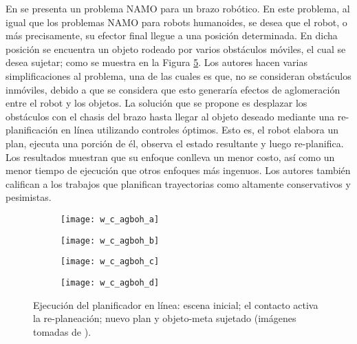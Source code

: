En \cite{8625041} se presenta un problema NAMO para un brazo robótico.
En este problema, al igual que los problemas NAMO para robots humanoides, se desea que el robot, o más precisamente, su efector final llegue a una posición determinada.
En dicha posición se encuentra un objeto rodeado por varios obstáculos móviles, el cual se desea sujetar; como se muestra en la Figura \ref{fig:8625041}.
Los autores hacen varias simplificaciones al problema, una de las cuales es que, no se consideran obstáculos inmóviles, debido a que se considera que esto generaría efectos de aglomeración entre el robot y los objetos.
La solución que se propone es desplazar los obstáculos con el chasis del brazo hasta llegar al objeto deseado mediante una re-planificación en línea utilizando controles óptimos. 
Esto es, el robot elabora un plan, ejecuta una porción de él, observa el estado resultante y luego re-planifica.
Los resultados muestran que su enfoque conlleva un menor costo, así como un menor tiempo de ejecución que otros enfoques más ingenuos.
Los autores también califican a los trabajos que planifican trayectorias como altamente conservativos y pesimistas.
%
\begin{figure}[H]
	\begin{subfigure}{0.35\linewidth}
		\texttt{[image: w\_c\_agboh\_a]}%
		\subcaption{}%
		\label{subfig:start_scene}%
	\end{subfigure}%
	\hspace{0.5cm}%
	\begin{subfigure}{0.35\linewidth}
		\texttt{[image: w\_c\_agboh\_b]}%
		\subcaption{}%
		\label{subfig:contact_replaning}%
	\end{subfigure}%
	
	\vspace{3pt}%
	\begin{subfigure}{0.35\linewidth}
		\texttt{[image: w\_c\_agboh\_c]}%
		\subcaption{}%
		\label{subfig:new_plan}%
	\end{subfigure}%
	\hspace{0.5cm}%
	\begin{subfigure}{0.35\linewidth}
		\texttt{[image: w\_c\_agboh\_d]}%
		\subcaption{}%
		\label{subfig:target_object_grasp}%
	\end{subfigure}%
	\caption{Ejecución del planificador en línea:  escena inicial;  el contacto activa la re-planeación;  nuevo plan y  objeto-meta sujetado (imágenes tomadas de \cite{8625041}).}%
	\label{fig:8625041}%
\end{figure}
